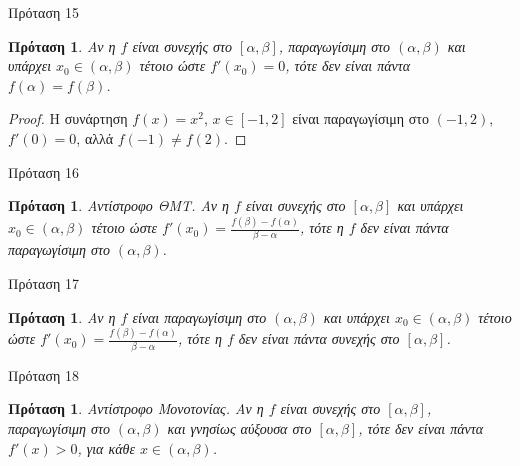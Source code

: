 \documentclass[greek]{beamer}
\newtheorem{proposition}[theorem]{Πρόταση}
\begin{document}
\begin{frame}{Πρόταση 15}
 \begin{proposition}
  \normalfont Αν η $f$ είναι συνεχής στο $\left[ \alpha ,\beta  \right]$, παραγωγίσιμη στο $\left( \alpha ,\beta  \right)$ και υπάρχει $x_0\in \left( \alpha ,\beta  \right)$ τέτοιο ώστε $f'\left( x_0 \right)=0$, τότε δεν είναι πάντα $f\left( \alpha  \right)=f\left( \beta  \right)$.
 \end{proposition}
 \begin{proof}
  Η συνάρτηση $f\left( x \right)={{x}^{2}}$, $x\in \left[ -1,2 \right]$ είναι παραγωγίσιμη στο $\left( -1,2 \right)$, $f'\left( 0 \right)=0$, αλλά $f\left( -1 \right)\ne f\left( 2 \right)$.
 \end{proof}
\end{frame}

\begin{frame}{Πρόταση 16}
 \begin{proposition}
  \normalfont Αντίστροφο ΘΜΤ. Αν η $f$ είναι συνεχής στο $\left[ \alpha ,\beta  \right]$ και υπάρχει ${{x}_{0}}\in \left( \alpha ,\beta  \right)$ τέτοιο ώστε $f'\left( x_0 \right)=\frac{f\left( \beta  \right)-f\left( \alpha  \right)}{\beta -\alpha }$, τότε η $f$ δεν είναι πάντα παραγωγίσιμη στο $\left( \alpha ,\beta  \right)$.
 \end{proposition}
\end{frame}

\begin{frame}{Πρόταση 17}
 \begin{proposition}
  \normalfont Αν η $f$ είναι παραγωγίσιμη στο $\left( \alpha ,\beta  \right)$ και υπάρχει ${{x}_{0}}\in \left( \alpha ,\beta  \right)$ τέτοιο ώστε $f'\left( x_0 \right)=\frac{f\left( \beta  \right)-f\left( \alpha  \right)}{\beta -\alpha }$, τότε η $f$ δεν είναι πάντα συνεχής στο $\left[ \alpha ,\beta  \right]$.
 \end{proposition}
\end{frame}

\begin{frame}{Πρόταση 18}
 \begin{proposition}
  \normalfont Αντίστροφο Μονοτονίας. Αν η $f$ είναι συνεχής στο $\left[ \alpha ,\beta  \right]$, παραγωγίσιμη στο $\left( \alpha ,\beta  \right)$ και γνησίως αύξουσα στο $\left[ \alpha ,\beta  \right]$, τότε δεν είναι πάντα $f'\left( x  \right)>0$, για κάθε $x\in \left( \alpha ,\beta  \right)$.
 \end{proposition}
\end{frame}
\end{document}
